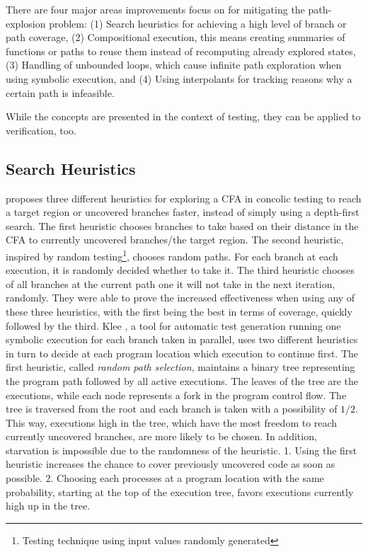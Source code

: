 There are four major areas improvements focus on for mitigating the path-explosion problem:
(1) Search heuristics for achieving a high level of branch or path coverage,
(2) Compositional execution, this means creating summaries of functions or paths to reuse them instead of recomputing already explored states,
(3) Handling of unbounded loops, which cause infinite path exploration when using symbolic execution, and
(4) Using interpolants for tracking reasons why a certain path is infeasible.


While the concepts are presented in the context of testing, they can be applied to verification, too.

\subsection*{Search Heuristics}
\cite{Burnim2008} proposes three different heuristics for exploring a CFA in concolic testing to reach a target region or uncovered branches faster, instead of simply using a depth-first search.
The first heuristic chooses branches to take based on their distance in the CFA to currently uncovered branches/the target region.
The second heuristic, inspired by random testing\footnote{Testing technique using input values randomly generated}, chooses random paths.
For each branch at each execution, it is randomly decided whether to take it.
The third heuristic chooses of all branches at the current path one it will not take in the next iteration, randomly.
They were able to prove the increased effectiveness when using any of these three heuristics, with the first being the best in terms of coverage, quickly followed by the third.
Klee \cite{Cadar2008}, a tool for automatic test generation running one symbolic execution for each branch taken in parallel, uses two different heuristics in turn to decide at each program location which execution to continue first.
The first heuristic, called \emph{random path selection}, maintains a binary tree representing the program path followed by all active executions.
The leaves of the tree are the executions, while each node represents a fork in the program control flow.
The tree is traversed from the root and each branch is taken with a possibility of $1/2$.
This way, executions high in the tree, which have the most freedom to reach currently uncovered branches, are more likely to be chosen.
In addition, starvation is impossible due to the randomness of the heuristic.
1. Using the first heuristic increases the chance to cover previously uncovered code as soon as possible.
2. Choosing each processes at a program location with the same probability, starting at the top of the execution tree, favors executions currently high up in the tree.

